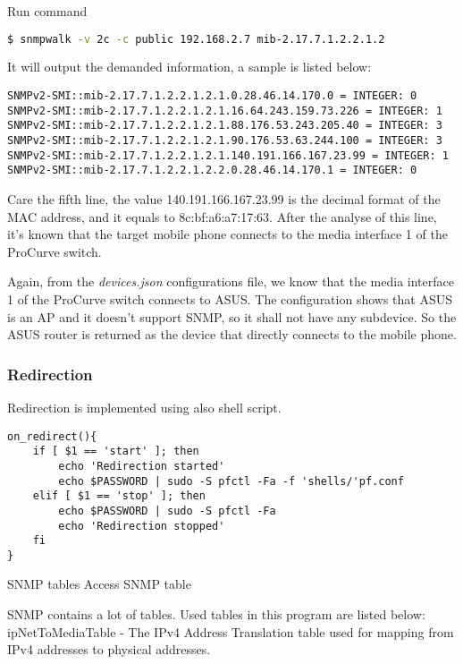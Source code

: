 Run command

\begin{lstlisting}[language=bash]
$ snmpwalk -v 2c -c public 192.168.2.7 mib-2.17.7.1.2.2.1.2
\end{lstlisting}

It will output the demanded information, a sample is listed below:

\begin{lstlisting}
SNMPv2-SMI::mib-2.17.7.1.2.2.1.2.1.0.28.46.14.170.0 = INTEGER: 0
SNMPv2-SMI::mib-2.17.7.1.2.2.1.2.1.16.64.243.159.73.226 = INTEGER: 1
SNMPv2-SMI::mib-2.17.7.1.2.2.1.2.1.88.176.53.243.205.40 = INTEGER: 3
SNMPv2-SMI::mib-2.17.7.1.2.2.1.2.1.90.176.53.63.244.100 = INTEGER: 3
SNMPv2-SMI::mib-2.17.7.1.2.2.1.2.1.140.191.166.167.23.99 = INTEGER: 1
SNMPv2-SMI::mib-2.17.7.1.2.2.1.2.2.0.28.46.14.170.1 = INTEGER: 0
\end{lstlisting}

Care the fifth line, the value 140.191.166.167.23.99 is the decimal format of the MAC address, and it equals to 8c:bf:a6:a7:17:63. After the analyse of this line, it's known that the target mobile phone connects to the media interface 1 of the ProCurve switch.

Again, from the \textit{devices.json} configurations file, we know that the media interface 1 of the ProCurve switch connects to ASUS. The configuration shows that ASUS is an AP and it doesn't support SNMP, so it shall not have any subdevice. So the ASUS router is returned as the device that directly connects to the mobile phone.

\subsubsection{Redirection}

Redirection is implemented using also shell script.

\begin{lstlisting}
on_redirect(){
	if [ $1 == 'start' ]; then
		echo 'Redirection started'
		echo $PASSWORD | sudo -S pfctl -Fa -f 'shells/'pf.conf
	elif [ $1 == 'stop' ]; then
		echo $PASSWORD | sudo -S pfctl -Fa
		echo 'Redirection stopped'
	fi
}
\end{lstlisting}



SNMP tables
Access SNMP table

SNMP contains a lot of tables.
Used tables in this program are listed below:
ipNetToMediaTable - The IPv4 Address Translation table used for mapping from
IPv4 addresses to physical addresses.


